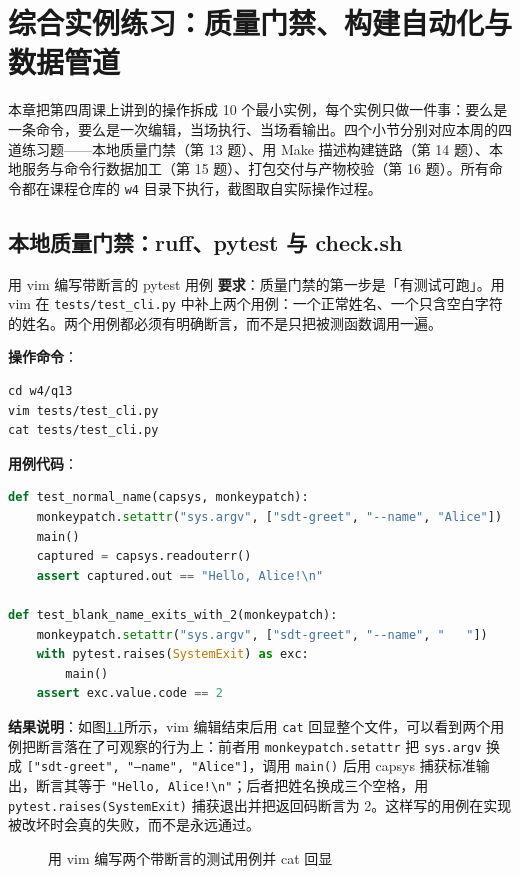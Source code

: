 \chapter{综合实例练习：质量门禁、构建自动化与数据管道}
\label{cp:ms4-practice}

本章把第四周课上讲到的操作拆成 10 个最小实例，每个实例只做一件事：要么是一条命令，要么是一次编辑，当场执行、当场看输出。四个小节分别对应本周的四道练习题——本地质量门禁（第 13 题）、用 Make 描述构建链路（第 14 题）、本地服务与命令行数据加工（第 15 题）、打包交付与产物校验（第 16 题）。所有命令都在课程仓库的 \verb|w4| 目录下执行，截图取自实际操作过程。

\section{本地质量门禁：ruff、pytest 与 check.sh}

\begin{exercise}{用 vim 编写带断言的 pytest 用例}
\textbf{要求}：质量门禁的第一步是「有测试可跑」。用 vim 在 \verb|tests/test_cli.py| 中补上两个用例：一个正常姓名、一个只含空白字符的姓名。两个用例都必须有明确断言，而不是只把被测函数调用一遍。

\textbf{操作命令}：
\begin{lstlisting}
cd w4/q13
vim tests/test_cli.py
cat tests/test_cli.py
\end{lstlisting}

\textbf{用例代码}：
\begin{lstlisting}[language=Python]
def test_normal_name(capsys, monkeypatch):
    monkeypatch.setattr("sys.argv", ["sdt-greet", "--name", "Alice"])
    main()
    captured = capsys.readouterr()
    assert captured.out == "Hello, Alice!\n"

def test_blank_name_exits_with_2(monkeypatch):
    monkeypatch.setattr("sys.argv", ["sdt-greet", "--name", "   "])
    with pytest.raises(SystemExit) as exc:
        main()
    assert exc.value.code == 2
\end{lstlisting}

\textbf{结果说明}：如图\ref{fig:ms4-01}所示，vim 编辑结束后用 \verb|cat| 回显整个文件，可以看到两个用例把断言落在了可观察的行为上：前者用 \verb|monkeypatch.setattr| 把 \verb|sys.argv| 换成 \texttt{["sdt-greet", "--name", "Alice"]}，调用 \verb|main()| 后用 capsys 捕获标准输出，断言其等于 \texttt{"Hello, Alice!\textbackslash n"}；后者把姓名换成三个空格，用 \verb|pytest.raises(SystemExit)| 捕获退出并把返回码断言为 2。这样写的用例在实现被改坏时会真的失败，而不是永远通过。

\begin{figure}[H]
    \centering
    \caption{用 vim 编写两个带断言的测试用例并 cat 回显}
    \label{fig:ms4-01}
\end{figure}
\end{exercise}

